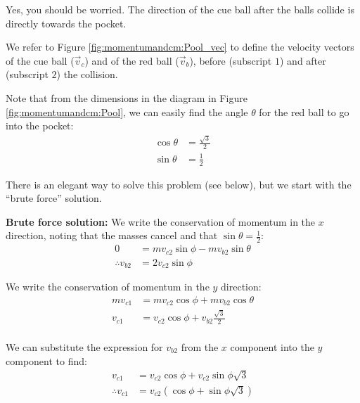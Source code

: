 
\begin{finalanswer}
Yes, you should be worried. The direction of the cue ball after the balls collide is directly towards the pocket. 
\end{finalanswer}
\begin{solution}
We refer to Figure \ref{fig:momentumandcm:Pool_vec} to define the velocity vectors of the cue ball ($\vec v_c$) and of the red ball ($\vec v_b$), before (subscript $1$) and after (subscript $2$) the collision. 


Note that from the dimensions in the diagram in Figure \ref{fig:momentumandcm:Pool}, we can easily find the angle $\theta$ for the red ball to go into the pocket:
\begin{align*}
\cos\theta&=\frac{\sqrt 3}{2}\\
\sin\theta&=\frac{1}{2}
\end{align*}

There is an elegant way to solve this problem (see below), but we start with the ``brute force'' solution.

\textbf{Brute force solution:} We write the conservation of momentum in the $x$ direction, noting that the masses cancel and that $\sin\theta=\frac{1}{2}$:
\begin{align*}
0&=mv_{c2}\sin\phi-mv_{b2}\sin\theta\\
\therefore v_{b2}&=2v_{c2}\sin\phi
\end{align*}

We write the conservation of momentum in the $y$ direction:
\begin{align*}
mv_{c1}&=mv_{c2}\cos\phi+mv_{b2}\cos\theta\\
v_{c1}&=v_{c2}\cos\phi+v_{b2}\frac{\sqrt 3}{2}\\
\end{align*}

We can substitute the expression for $v_{b2}$ from the $x$ component into the $y$ component to find:
\begin{align*}
v_{c1}&=v_{c2}\cos\phi+v_{c2}\sin\phi\sqrt 3\\
\therefore v_{c1}&=v_{c2}(\cos\phi+\sin\phi\sqrt 3)\\
\end{align*}


\end{solution}
